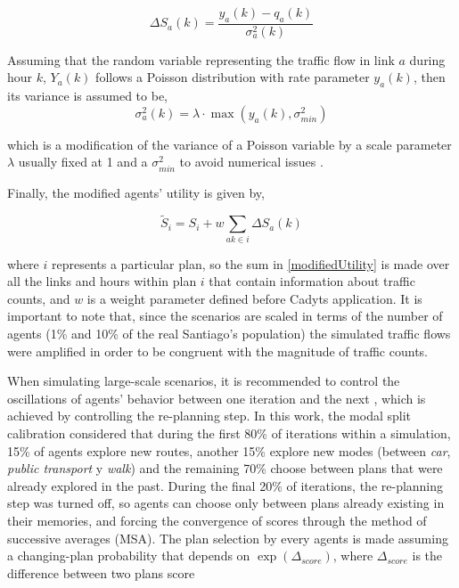 \documentclass[Journal,letterpaper]{ascelike-new}
\begin{document}
\begin{equation}
\Delta S_{a}(k)=\frac{y_{a}(k)-q_{a}(k)}{\sigma^2_{a}(k)}
\end{equation}


Assuming that the random variable representing the traffic flow in link $a$ during hour $k$, $Y_{a}(k)$ follows a Poisson distribution with rate parameter $y_{a}(k)$, then its variance is assumed to be,
\begin{equation}
\label{modifiedVariance}
\sigma_{a}^2(k)=\lambda\cdot \max(y_{a}(k), \sigma^2_{min})
\end{equation}

which is a modification of the variance of a Poisson variable by a scale parameter $\lambda$ usually fixed at 1 and a $\sigma^2_{min}$ to avoid numerical issues \citep{flotterod2011bayesian}.

Finally, the modified agents' utility is given by,

\begin{equation}
\label{modifiedUtility}
\tilde{S}_{\mathit{i}}=S_{\mathit{i}}+w\sum_{ak\in \mathit{i}}\Delta S_{a}(k)
\end{equation}

where $i$ represents a particular plan, so the sum in \ref{modifiedUtility} is made over all the links and hours within plan $i$ that contain information about traffic counts, and $w$ is a weight parameter defined before Cadyts application. It is important to note that, since the scenarios are scaled in terms of the number of agents (1\% and 10\% of the real Santiago's population) the simulated traffic flows were amplified in order to be congruent with the magnitude of traffic counts.

When simulating large-scale scenarios, it is recommended to control the oscillations of agents' behavior between one iteration and the next \citep{MATSimSantiago}, which is achieved by controlling the re-planning step. In this work, the modal split calibration considered that during the first 80\% of iterations within a simulation, 15\% of agents explore new routes, another 15\% explore new modes (between \emph{car}, \emph{public transport} y \emph{walk}) and the remaining 70\% choose between plans that were already explored in the past. During the final 20\% of iterations, the re-planning step was turned off, so agents can choose only between plans already existing in their memories, and forcing the convergence of scores through the method of successive averages (MSA). The plan selection by every agents is made assuming a changing-plan probability that depends on $\exp(\Delta_{score})$, where $\Delta_{score}$ is the difference between two plans score \citep{ConfiguringMATSim}
\end{document}
